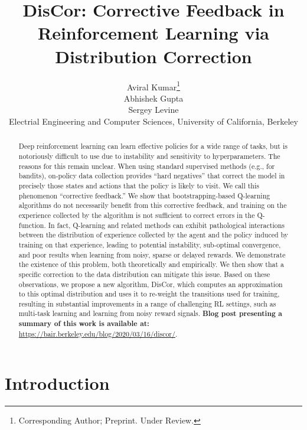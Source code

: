 \documentclass[jmlr]{article}
\author{\name Aviral Kumar\thanks{Corresponding Author; Preprint. Under Review.} \email {aviralk@berkeley.edu}\\
\name Abhishek Gupta \email {abhigupta@berkeley.edu} \\
\name Sergey Levine \email {svlevine@eecs.berkeley.edu} \\
\addr Electrial Engineering and Computer Sciences, University of California, Berkeley}
\begin{document}

\title{\textbf{DisCor: Corrective Feedback in Reinforcement Learning via Distribution Correction}}
\editor{}
\maketitle
















\begin{abstract}
Deep reinforcement learning can learn effective policies for a wide range of tasks, but is notoriously difficult to use due to instability and sensitivity to hyperparameters. The reasons for this remain unclear. When using standard supervised methods (e.g., for bandits), on-policy data collection provides ``hard negatives'' that correct the model in precisely those states and actions that the policy is likely to visit. We call this phenomenon ``corrective feedback.'' We show that bootstrapping-based Q-learning algorithms do not necessarily benefit from this corrective feedback, and training on the experience collected by the algorithm is not sufficient to correct errors in the Q-function.
In fact, Q-learning and related methods can exhibit pathological interactions between the distribution of experience collected by the agent and the policy induced by training on that experience, leading to potential instability, sub-optimal convergence, and poor results when learning from noisy, sparse or delayed rewards. We demonstrate the existence of this problem, both theoretically and empirically. We then show that a specific correction to the data distribution can mitigate this issue. Based on these observations, we propose a new algorithm, DisCor, which computes an approximation to this optimal distribution and uses it to re-weight the transitions used for training, resulting in substantial improvements in a range of challenging RL settings, such as multi-task learning and learning from noisy reward signals. \textbf{Blog post presenting a summary of this work is available at:} \url{https://bair.berkeley.edu/blog/2020/03/16/discor/}.
\end{abstract}

\section{Introduction}
\end{document}
